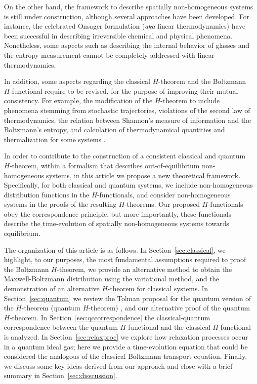 On the other hand, the framework to describe spatially non-homogeneous systems is still
under construction, although several approaches have been developed. For instance,
the celebrated Onsager formulation (\textit{aka} linear thermodynamics)
\cite{bib:keizer1987,bib:onsager1931} have been successful in describing irreversible chemical 
and physical phenomena. Nonetheless, some aspects such as describing the internal behavior of glasses
\cite{bib:zanotto2018} and the entropy measurement
\cite{bib:schmelzer2018,bib:nemilov2018} cannot be completely addressed with linear thermodynamics.

In addition, some aspects regarding the classical $H$-theorem and the
Boltzmann $H$-functional require to be revised, for the purpose of improving their mutual consistency.
For example, the modification of the $H$-theorem to include phenomena stemming from stochastic
trajectories, violations of the second law of thermodynamics, the relation
between Shannon's measure of information and the Boltzmann's entropy, 
and calculation of thermodynamical quantities and thermalization for some systems
\cite{bib:gorban2014,bib:li2019,bib:gring2012,bib:nemilov2018,bib:wang2014}.

In order to contribute to the construction of a consistent classical and
quantum $H$-theorem, within a formalism that describes out-of-equilibrium
non-homogeneous systems, in this article we propose a new theoretical framework.
Specifically, for both classical and quantum systems, we include non-homogeneous distribution functions in
the $H$-functionals, and consider non-homogeneous systems in the proofs of the resulting
$H$-theorems. Our proposed $H$-functionals obey
the correspondence principle, but more importantly, these functionals describe
the time-evolution of spatially non-homogeneous
systems towards equilibrium.

The organization of this article is as follows.
In Section~\ref{sec:classical}, we highlight, to our purposes, the most
fundamental assumptions required to proof the Boltzmann $H$-theorem,
we provide an alternative method to obtain the Maxwell-Boltzmann
distribution using the variational method, and the demonstration of
an alternative $H$-theorem for classical systems. In Section~\ref{sec:quantum}
we review the Tolman proposal for the quantum
version of the $H$-theorem (quantum $H$-theorem)
,
and our alternative proof of the quantum $H$-theorem. In 
Section~\ref{sec:qccorrespondence}
the classical-quantum correspondence between the
quantum $H$-functional and the classical $H$-functional is analyzed.
In Section~\ref{sec:relaxproc} we explore how relaxation processes occur
in a quantum ideal gas; here we provide a time-evolution equation that could be
considered the analogous of the classical Boltzmann transport equation. Finally,
we discuss some key ideas derived from our approach and close with a brief summary
in Section~\ref{sec:disscussion}.



